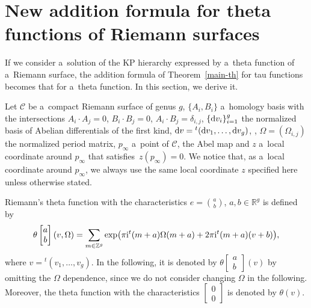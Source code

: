 \documentclass[pdftex]{sigma}
\numberwithin{equation}{section}
\theoremstyle{definition}
\begin{document}
\section{New addition formula for theta functions of Riemann surfaces}\label{sec6}
If we consider a~solution of the KP hierarchy expressed by a~theta function of a~Riemann surface,
the addition formula of Theorem~\ref{main-th} for tau functions becomes that for a~theta function.
 In this section, we derive it.


Let ${\mathcal C}$ be a~compact Riemann surface of genus $g$, $\{A_i,B_i\}$ a~homology basis
with the intersections $A_i\cdot A_j=0$, $B_i\cdot B_j=0$, $A_i\cdot B_j=\delta_{i,j}$,
$\{{\rm d}v_i\}_{i=1}^g$ the normalized basis of Abelian differentials of the first kind, ${\rm d}v={}^t({\rm d}v_1,\dots ,{\rm d}v_g)$, , $\Omega=(\Omega_{i,j})$ the normalized period matrix, $p_\infty$ a~point of ${\mathcal C}$,  the Abel map and $z$ a~local coordinate around $p_\infty$ that satisfies~${z(p_\infty)=0}$.
We notice that, as a~local coordinate around $p_\infty$, we always use the same local coordinate $z$ specified here unless otherwise stated.


Riemann's theta function with the characteristics $e=\binom{a}{b}$, $a,b\in {\mathbb R}^g$
is defined by
\begin{gather*}
\theta
\left[\begin{matrix}
a\\b
\end{matrix}\right]
(v,\Omega)=\sum_{m\in {\mathbb Z}^g}\exp\bigl(\pi{\rm i}{}^t(m+a) \Omega (m+a)+2\pi{\rm i} {}^t (m+a)(v+b)\bigr),
\end{gather*}
where $v={}^t(v_1,\dots ,v_g)$.
In the following, it is denoted by
$ \theta\left[\begin{smallmatrix}a\\b\end{smallmatrix}\right](v)$
by omitting the
$\Omega$ dependence, since we do not consider changing $\Omega$ in the
following.
Moreover, the theta function with the characteristics
$\left[\begin{smallmatrix}0\\0\end{smallmatrix}\right]$ is
denoted by $\theta(v)$.
\end{document}
